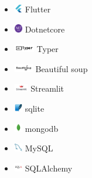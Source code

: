 \documentclass{article}
\begin{document}
\begin{multicols}{3}
\begin{itemize}
    \item \includegraphics[height=10pt]{images/icons/flutter-original.png} Flutter
    \item \includegraphics[height=10pt]{images/icons/dotnetcore.png} Dotnetcore
    \item \includegraphics[height=10pt]{images/icons/typer.png} Typer
    \item \includegraphics[height=10pt]{images/icons/bs.png} Beautiful soup
    \item \includegraphics[height=10pt]{images/icons/streamlit.png} Streamlit
    \item \includegraphics[height=10pt]{images/icons/sqlite-original.png} sqlite
    \item \includegraphics[height=10pt]{images/icons/mongodb-original.png} mongodb
    \item \includegraphics[height=10pt]{images/icons/mysql-original.png} MySQL
    \item \includegraphics[height=10pt]{images/icons/sqlalchemy-original.png} SQLAlchemy
\end{itemize}


\end{multicols}
\end{document}
